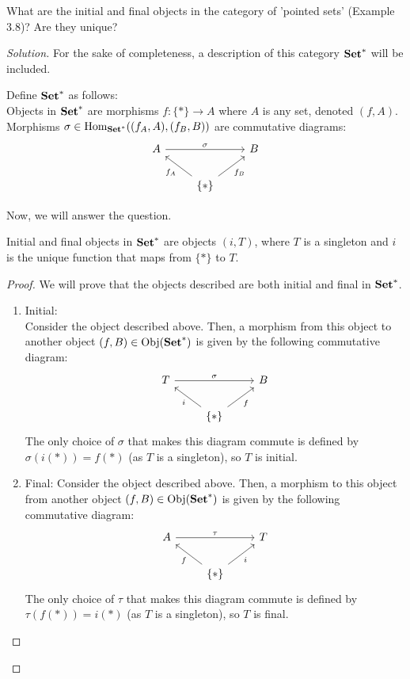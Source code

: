 \documentclass[12pt]{article}
\newenvironment{problem}[2][Problem]{\begin{trivlist}
\item[\hskip \labelsep {\bfseries #1}\hskip \labelsep {\bfseries #2.}]}{\end{trivlist}}
\newenvironment{proposition}[1][Proposition]{\begin{trivlist}
\item[\hskip \labelsep {\bfseries #1.}]}{\end{trivlist}}
\newenvironment{definition}[1][Definition]{\begin{trivlist}
\item[\hskip \labelsep {\bfseries #1.}]}{\end{trivlist}}
\newcommand{\catsup}[2]{\normalfont\textbf{#1}^{#2}}
\newcommand{\Hom}{\text{Hom}}
\newcommand{\Obj}{\text{Obj}}
\newenvironment{solution}
  {\renewcommand\qedsymbol{$\blacksquare$}\begin{proof}[Solution]}
{\end{proof}}
\newenvironment{sproof}{
  \renewcommand\qedsymbol{$\square$}
  \begin{proof}
  }{
  \end{proof}
}
\begin{document}
\newpage

\begin{problem}{5.4}
  What are the initial and final objects in the category of 'pointed sets' (Example 3.8)? Are they unique?
\end{problem}
\begin{solution}
  For the sake of completeness, a description of this category $\catsup{Set}{*}$ will be included.
  \begin{definition}
    Define $\catsup{Set}{*}$ as follows:\\
    Objects in $\catsup{Set}{*}$ are morphisms $f : \{*\} \to A$ where $A$ is any set, denoted $(f, A)$. \\
    Morphisms $\sigma \in \Hom_{\catsup{Set}{*}}( (f_A, A), (f_B, B))$ are commutative diagrams: 
    \[\begin{tikzcd}
        A \ar{rr}{\sigma} && B \\
        & \{*\} \ar{ul}{f_A} \ar{ur}[swap]{f_B}
    \end{tikzcd}\]
  \end{definition}
  Now, we will answer the question.
  \begin{proposition}
    Initial and final objects in $\catsup{Set}*$ are objects $(i, T)$, where $T$ is a singleton and $i$ is the unique function that maps from $\{*\}$ to $T$.
  \end{proposition}
  \begin{sproof}
    We will prove that the objects described are both initial and final in $\catsup{Set}*$.
    \begin{enumerate}
      \item Initial: \\
        Consider the object described above. 
        Then, a morphism from this object to another object 
        $(f, B)\in \Obj(\catsup{Set}*)$
        is given by the following commutative diagram:
        \[\begin{tikzcd}
          T \ar{rr}{\sigma} && B \\
          & \{*\} \ar{ul}{i} \ar{ur}[swap]{f}
        \end{tikzcd}\]
        The only choice of $\sigma$ that makes this diagram commute is defined by $\sigma(i(*)) = f(*)$ (as $T$ is a singleton), so $T$ is initial.

      \item Final: 
        Consider the object described above. 
        Then, a morphism to this object from another object 
        $(f, B)\in \Obj(\catsup{Set}*)$
        is given by the following commutative diagram:
        \[\begin{tikzcd}
          A \ar{rr}{\tau} && T \\
          & \{*\} \ar{ul}{f} \ar{ur}[swap]{i}
        \end{tikzcd}\]
        The only choice of $\tau$ that makes this diagram commute is defined by $\tau(f(*)) = i(*)$ (as $T$ is a singleton), so $T$ is final.
    \end{enumerate}
  \end{sproof}
\end{solution}
\end{document}
